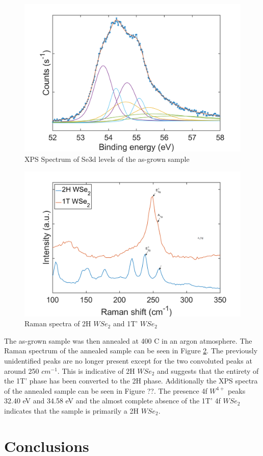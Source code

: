 \begin{figure}[!h]
	\begin{center}
		\includegraphics[scale=0.3]{1T'/XPSSe3dPre.png}
		\caption{XPS Spectrum of Se3d levels of the as-grown sample}
		\label{fig:1T'XPSSe3dPreSpectrum}
	\end{center}
\end{figure}

\begin{figure}[!h]
	\begin{center}
		\includegraphics[scale=0.3]{1T'/RamanSpectraComparison.png}
		\caption{Raman spectra of 2H $WSe_2$ and 1T' $WSe_2$}
		\label{fig:1T'RamanSpectraComparison}
	\end{center}
\end{figure}

The as-grown sample was then annealed at 400 {\degree}C in an argon atmosphere. The Raman spectrum of the annealed sample can be seen in Figure \ref{fig:1T'RamanSpectraComparison}. The previously unidentified peaks are no longer present except for the two convoluted peaks at around 250 $cm^{-1}$. This is indicative of 2H $WSe_2$ and suggests that the entirety of the 1T' phase has been converted to the 2H phase. Additionally the XPS spectra of the annealed sample can be seen in Figure ??. The presence 4f $W^{4+}$ peaks 32.40 eV and 34.58 eV and the almost complete absence of the 1T' 4f $WSe_2$ indicates that the sample is primarily a 2H $WSe_2$. 

\section{Conclusions}